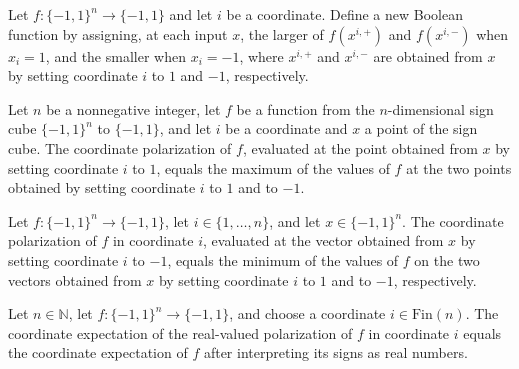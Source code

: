 \begin{definition}
\label{FABL.coordinatePolarization}
\leanok
{}
Let $f:\{−1,1\}^n\to\{−1,1\}$ and let $i$ be a coordinate. Define a new Boolean function
by assigning, at each input $x$, the larger of $f(x^{i,+})$ and $f(x^{i,-})$ when
$x_i=1$, and the smaller when $x_i=-1$, where $x^{i,+}$ and $x^{i,-}$ are obtained from
$x$ by setting coordinate $i$ to $1$ and $-1$, respectively.
\end{definition}

\begin{theorem}
\label{FABL.coordinatePolarization_setCoordinate_one}
\leanok
{}
Let $n$ be a nonnegative integer, let $f$ be a function from the $n$-dimensional sign
cube $\{-1,1\}^n$ to $\{-1,1\}$, and let $i$ be a coordinate and $x$ a point of the
sign cube. The coordinate polarization of $f$, evaluated at the point obtained from $x$
by setting coordinate $i$ to $1$, equals the maximum of the values of $f$ at the two
points obtained by setting coordinate $i$ to $1$ and to $-1$.
\end{theorem}

\begin{theorem}
\label{FABL.coordinatePolarization_setCoordinate_neg_one}
\leanok
{}
Let $f:\{−1,1\}^n\to\{−1,1\}$, let $i\in\{1,\ldots,n\}$, and let $x\in\{−1,1\}^n$. The
coordinate polarization of $f$ in coordinate $i$, evaluated at the vector obtained from
$x$ by setting coordinate $i$ to $-1$, equals the minimum of the values of $f$ on the
two vectors obtained from $x$ by setting coordinate $i$ to $1$ and to $-1$,
respectively.
\end{theorem}

\begin{theorem}
\label{FABL.coordinateExpectation_coordinatePolarization_toReal}
\leanok
{}
Let $n\in\mathbb N$, let $f:\{−1,1\}^n\to\{−1,1\}$, and choose a coordinate
$i\in\mathrm{Fin}(n)$. The coordinate expectation of the real-valued polarization of $f$
in coordinate $i$ equals the coordinate expectation of $f$ after interpreting its signs
as real numbers.
\end{theorem}

